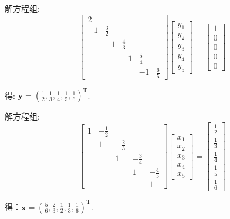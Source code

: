 \documentclass[a4paper]{article}
\begin{document}
解方程组:
\begin{equation}
    \left[\begin{array}{ccccc}2 & & & \\ -1 & \frac{3}{2} & & \\ & -1 & \frac{4}{3} & \\ & & -1 & \frac{5}{4} \\ & & & -1 & \frac{6}{5}\end{array}\right]\left[\begin{array}{l}y_{1} \\ y_{2} \\ y_{3} \\ y_{4} \\ y_{5}\end{array}\right]=\left[\begin{array}{l}1 \\ 0 \\ 0 \\ 0 \\ 0\end{array}\right] \nonumber
\end{equation} \par
得: $\boldsymbol{y} = (\frac{1}{2}, \frac{1}{3}, \frac{1}{4}, \frac{1}{5}, \frac{1}{6})^{\mathrm{T}}$. \par
解方程组:
\begin{equation}
    \left[\begin{array}{ccccc}1 &-\frac{1}{2} & & \\  & 1 &-\frac{2}{3} & \\ &  & 1 & -\frac{3}{4}\\ & &  & 1 &-\frac{4}{5} \\ & & &  & 1\end{array}\right]\left[\begin{array}{l}x_{1} \\ x_{2} \\ x_{3} \\ x_{4} \\ x_{5}\end{array}\right]=\left[\begin{array}{l}\frac{1}{2} \\ \frac{1}{3} \\ \frac{1}{4} \\ \frac{1}{5} \\ \frac{1}{6}\end{array}\right] \nonumber
\end{equation}\par
得：$\boldsymbol{x} = (\frac{5}{6}, \frac{2}{3}, \frac{1}{2}, \frac{1}{3}, \frac{1}{6})^{\mathrm{T}}$.
\end{document}
